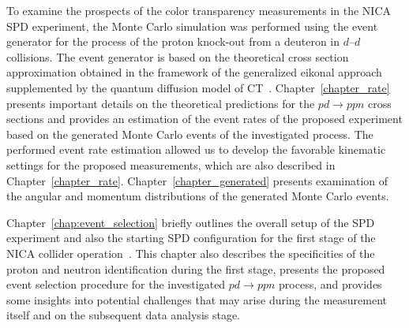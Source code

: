 To examine the prospects of the color transparency measurements in the NICA SPD experiment, the Monte Carlo simulation was performed using the event generator for the process of the proton knock-out from a deuteron in $d$--$d$ collisions. The event generator is based on the theoretical cross section approximation obtained in the framework of the generalized eikonal approach supplemented by the quantum diffusion model of CT~\cite{Frankfurt:1996uz,PhysRevC.107.014605,Larionov:2025equ,Farrar:1988me}. Chapter~\ref{chapter_rate} presents important details on the theoretical predictions for the $pd\rightarrow ppn$ cross sections and provides an estimation of the event rates of the proposed experiment based on the generated Monte Carlo events of the investigated process. The performed event rate estimation allowed us to develop the favorable kinematic settings for the proposed measurements, which are also described in Chapter~\ref{chapter_rate}. Chapter~\ref{chapter_generated} presents examination of the angular and momentum distributions of the generated Monte Carlo events.


Chapter~\ref{chap:event_selection} briefly outlines the overall setup of the SPD experiment and also the starting SPD configuration for the first stage of the NICA collider operation~\cite{TDR_SPD}. This chapter also describes the specificities of the proton and neutron identification during the first stage, presents the proposed event selection procedure for the investigated $pd\rightarrow ppn$ process, and provides some insights into potential challenges that may arise during the measurement itself and on the subsequent data analysis stage.


